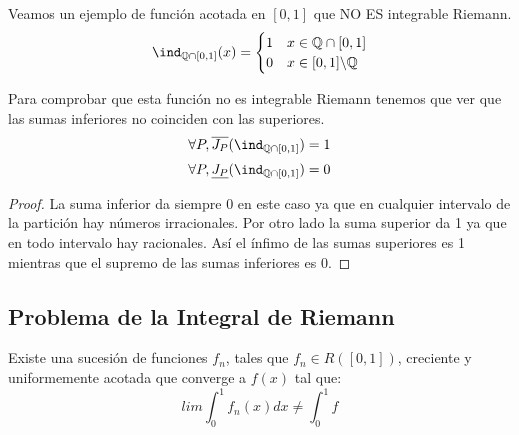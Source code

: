 \documentclass{apuntes}
\begin{document}
\begin{example}
Veamos un ejemplo de función acotada en $[ 0,1]$ que NO ES integrable Riemann.
\[
 \ind_{\mathbb{Q}  \cap  [0,1]} (x) =
  \begin{cases}
   1 &  x \in \mathbb{Q} \cap [0,1] \\
   0       &  x \in [0,1] \backslash \mathbb{Q}
  \end{cases}
\]

Para comprobar que esta función no es integrable Riemann tenemos que ver que las sumas inferiores no coinciden con las superiores.
\[\forall P, \overline{J_P}(\ind_{\mathbb{Q} \cap [0,1]}) = 1\]
\[\forall P, \underline{J_P}(	\ind_{\mathbb{Q} \cap [0,1]}) = 0\]


\begin{proof}
La suma inferior da siempre 0 en este caso ya que en cualquier intervalo de la partición hay números irracionales. Por otro lado la suma superior da 1 ya que en todo intervalo hay racionales. Así el ínfimo de las sumas superiores es 1 mientras que el supremo de las sumas inferiores es 0.
\end{proof}
\end{example}

\subsection{Problema de la Integral de Riemann}
Existe una sucesión de funciones $f_n$, tales que $f_n\in R([ 0, 1 ])$, creciente y uniformemente acotada que converge a $f(x)$ tal que:
\[lim \int_0^1 f_n(x) dx \neq \int_0^1 f\]
\end{document}
